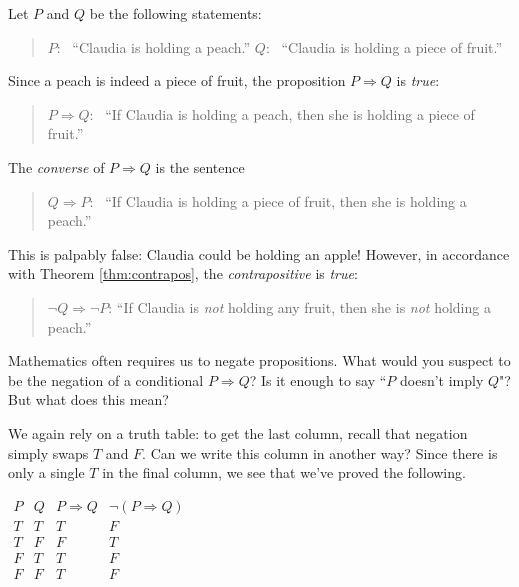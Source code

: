 \begin{example}{}{}
	Let $P$ and $Q$ be the following statements:
	\begin{quote}
	  $P$: \ ``Claudia is holding a peach.''\qquad\qquad
	  $Q$: \ ``Claudia is holding a piece of fruit.''
	\end{quote}
	Since a peach is indeed a piece of fruit, the proposition $P\Longrightarrow Q$ is \emph{true}:
	\begin{quote}
		$P\Longrightarrow Q$: \ ``If Claudia is holding a peach, then she is holding a piece of fruit.''
	\end{quote}
	The \emph{converse} of $P\Longrightarrow Q$ is the sentence
	\begin{quote}
	  $Q\Longrightarrow P$: \ ``If Claudia is holding a piece of fruit, then she is holding a peach.''
	\end{quote}
	This is palpably false: Claudia could be holding an apple! However, in accordance with Theorem \ref{thm:contrapos}, the \emph{contrapositive} is \emph{true}:
	\begin{quote}
	  $\neg Q\Longrightarrow \neg P$: ``If Claudia is \emph{not} holding any fruit, then she is \emph{not} holding a peach.''
	\end{quote} 
\end{example}

 

Mathematics often requires us to negate propositions. What would you suspect to be the negation of a conditional $P\Longrightarrow Q$? Is it enough to say ``$P$ doesn't imply $Q$"? But what does this mean? 

\begin{minipage}[t]{0.64\linewidth}\vspace{-2pt}
We again rely on a truth table: to get the last column, recall that negation simply swaps $T$ and $F$. Can we write this column in another way? Since there is only a single $T$ in the final column, we see that we've proved the following.
\end{minipage}
\hfill
\begin{minipage}[t]{0.35\linewidth}\vspace{-5pt}
\flushright $\begin{array}{cc|c|c}
		P & Q & P\Longrightarrow Q & \neg(P\Longrightarrow Q)\\\hline
		T & T & T & F\\
		T & F & F & T\\
		F & T & T & F\\
		F & F & T & F
	\end{array}$
\end{minipage}



